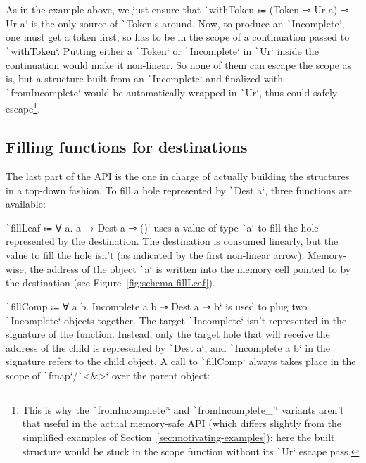 \documentclass[english]{jflart}
\begin{document}
As in the example above, we just ensure that \texttt`withToken ⩴ (Token ⊸ Ur a) ⊸ Ur a` is the only source of \texttt`Token`s around. Now, to produce an \texttt`Incomplete`, one must get a token first, so has to be in the scope of a continuation passed to \texttt`withToken`. Putting either a \texttt`Token` or \texttt`Incomplete` in \texttt`Ur` inside the continuation would make it non-linear. So none of them can escape the scope as is, but a structure built from an \texttt`Incomplete` and finalized with \texttt`fromIncomplete` would be automatically wrapped in \texttt`Ur`, thus could safely escape\footnote{This is why the \texttt`fromIncomplete'` and \texttt`fromIncomplete_'` variants aren't that useful in the actual memory-safe API (which differs slightly from the simplified examples of Section~\ref{sec:motivating-examples}): here the built structure would be stuck in the scope function without its \texttt`Ur` escape pass.}.

\subsection{Filling functions for destinations}

The last part of the API is the one in charge of actually building the structures in a top-down fashion. To fill a hole represented by \texttt`Dest a`, three functions are available:

\texttt`fillLeaf ⩴ ∀ a. a → Dest a ⊸ ()` uses a value of type \texttt`a` to fill the hole represented by the destination. The destination is consumed linearly, but the value to fill the hole isn't (as indicated by the first non-linear arrow). Memory-wise, the address of the object \texttt`a` is written into the memory cell pointed to by the destination (see Figure~\ref{fig:schema-fillLeaf}).

\texttt`fillComp ⩴ ∀ a b. Incomplete a b ⊸ Dest a ⊸ b` is used to plug two \texttt`Incomplete` objects together. The target \texttt`Incomplete` isn't represented in the signature of the function. Instead, only the target hole that will receive the address of the child is represented by \texttt`Dest a`; and \texttt`Incomplete a b` in the signature refers to the child object. A call to \texttt`fillComp` always takes place in the scope of \texttt`fmap`/\texttt`<&>` over the parent object:
\end{document}

